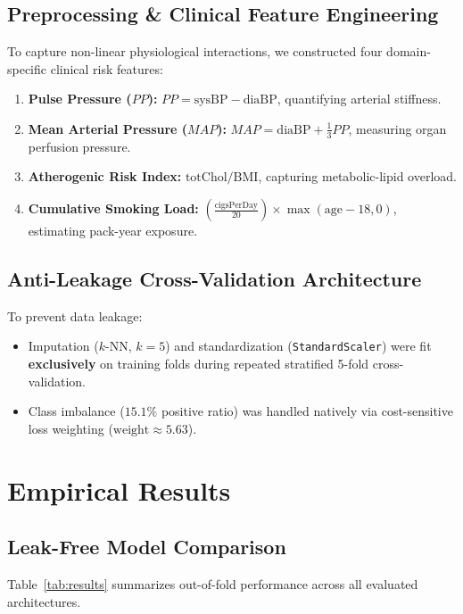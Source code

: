 \documentclass[manuscript, screen, review]{jair}
\begin{document}
\subsection{Preprocessing \& Clinical Feature Engineering}
To capture non-linear physiological interactions, we constructed four domain-specific clinical risk features:
\begin{enumerate}
    \item \textbf{Pulse Pressure ($PP$):} $PP = \text{sysBP} - \text{diaBP}$, quantifying arterial stiffness.
    \item \textbf{Mean Arterial Pressure ($MAP$):} $MAP = \text{diaBP} + \frac{1}{3}PP$, measuring organ perfusion pressure.
    \item \textbf{Atherogenic Risk Index:} $\text{totChol} / \text{BMI}$, capturing metabolic-lipid overload.
    \item \textbf{Cumulative Smoking Load:} $\left(\frac{\text{cigsPerDay}}{20}\right) \times \max(\text{age} - 18, 0)$, estimating pack-year exposure.
\end{enumerate}

\subsection{Anti-Leakage Cross-Validation Architecture}
To prevent data leakage:
\begin{itemize}
    \item Imputation ($k$-NN, $k=5$) and standardization (\texttt{StandardScaler}) were fit \textbf{exclusively} on training folds during repeated stratified 5-fold cross-validation.
    \item Class imbalance ($15.1\%$ positive ratio) was handled natively via cost-sensitive loss weighting ($\text{weight} \approx 5.63$).
\end{itemize}

\section{Empirical Results}

\subsection{Leak-Free Model Comparison}
Table~\ref{tab:results} summarizes out-of-fold performance across all evaluated architectures.
\end{document}
